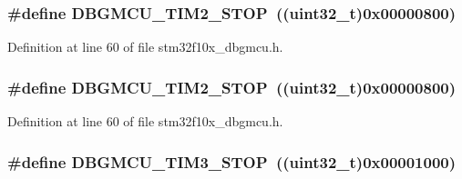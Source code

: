 \subsubsection[{\texorpdfstring{D\+B\+G\+M\+C\+U\+\_\+\+T\+I\+M2\+\_\+\+S\+T\+OP}{DBGMCU_TIM2_STOP}}]{\setlength{\rightskip}{0pt plus 5cm}\#define D\+B\+G\+M\+C\+U\+\_\+\+T\+I\+M2\+\_\+\+S\+T\+OP~(({\bf uint32\+\_\+t})0x00000800)}\hypertarget{group___d_b_g_m_c_u___exported___constants_ga8ba3a77260f748793c903468a4608bd1}{}\label{group___d_b_g_m_c_u___exported___constants_ga8ba3a77260f748793c903468a4608bd1}


Definition at line 60 of file stm32f10x\+\_\+dbgmcu.\+h.

\subsubsection[{\texorpdfstring{D\+B\+G\+M\+C\+U\+\_\+\+T\+I\+M2\+\_\+\+S\+T\+OP}{DBGMCU_TIM2_STOP}}]{\setlength{\rightskip}{0pt plus 5cm}\#define D\+B\+G\+M\+C\+U\+\_\+\+T\+I\+M2\+\_\+\+S\+T\+OP~(({\bf uint32\+\_\+t})0x00000800)}\hypertarget{group___d_b_g_m_c_u___exported___constants_ga8ba3a77260f748793c903468a4608bd1}{}\label{group___d_b_g_m_c_u___exported___constants_ga8ba3a77260f748793c903468a4608bd1}


Definition at line 60 of file stm32f10x\+\_\+dbgmcu.\+h.

\subsubsection[{\texorpdfstring{D\+B\+G\+M\+C\+U\+\_\+\+T\+I\+M3\+\_\+\+S\+T\+OP}{DBGMCU_TIM3_STOP}}]{\setlength{\rightskip}{0pt plus 5cm}\#define D\+B\+G\+M\+C\+U\+\_\+\+T\+I\+M3\+\_\+\+S\+T\+OP~(({\bf uint32\+\_\+t})0x00001000)}\hypertarget{group___d_b_g_m_c_u___exported___constants_ga28c01c2c30bed78e51d997007986fac9}{}\label{group___d_b_g_m_c_u___exported___constants_ga28c01c2c30bed78e51d997007986fac9}


